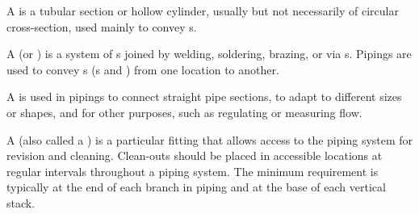 \begin{module}[id=piping]

\begin{definition}
  A  is a tubular section or hollow cylinder, usually but not necessarily of
  circular cross-section, used mainly to convey s.
\end{definition}

\begin{definition}
  A  (or ) is a system of s joined
  by welding, soldering, brazing, or via s. Pipings are used to convey
  s (s and )
  from one location to another.
\end{definition}

\begin{definition}
  A  is used in pipings to connect straight pipe sections, to adapt to
  different sizes or shapes, and for other purposes, such as regulating or measuring
   flow.
\end{definition}

\begin{definition}
  A  (also called a ) is a particular fitting
  that allows access to the piping system for revision and
  cleaning. Clean-outs should be placed in accessible locations at regular intervals
  throughout a piping system. The minimum requirement is typically at the end of each
  branch in piping and at the base of each vertical stack.
\end{definition}
\end{module}

